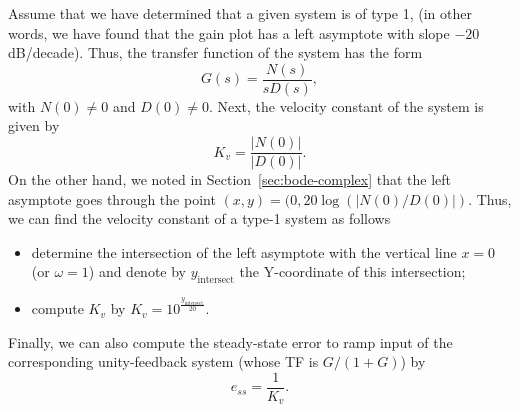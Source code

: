 \documentclass[a4paper,11pt]{report}
\theoremstyle{definition}
\begin{document}
Assume that we have determined that a given system is of type 1, (in
other words, we have found that the gain plot has a left asymptote
with slope $-20$\,dB/decade). Thus, the transfer function of the
system has the form
\[
G(s) = \frac{N(s)}{sD(s)},
\]
with $N(0)\neq 0$ and $D(0)\neq 0$. Next, the velocity constant of the
system is given by
\[
K_v = \frac{|N(0)|}{|D(0)|}.
\]
On the other hand, we noted in Section~\ref{sec:bode-complex} that the
left asymptote goes through the point
$(x,y)=(0,20\log(|N(0)/D(0)|)$. Thus, we can find the velocity
constant of a type-1 system as follows
\begin{itemize}
\item determine the intersection of the left asymptote with the
  vertical line $x=0$ (or $\omega=1$) and denote by
  $y_\mathrm{intersect}$ the Y-coordinate of this intersection;
\item compute $K_v$ by $K_v = 10^{\frac{y_\mathrm{intersect}}{20}}$.
\end{itemize}

Finally, we can also compute the steady-state error to ramp input of
the corresponding unity-feedback system (whose TF is $G/(1+G)$) by
\[
e_{ss} = \frac{1}{K_v}.
\]
\end{document}
